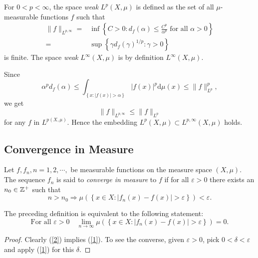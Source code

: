 \begin{definition}
  For $0<p<\infty$, the space \textit{weak} $L^{p}(X,\mu)$ is defined as the set of all $\mu$-measurable functions $f$ such that
  \begin{equation*}
    \begin{aligned}
      \|f\|_{L^{p,\infty}}=&\inf \left\{ C>0:d_f(\alpha)\le \frac{C^{p}}{\alpha ^{p}} \text{ for all }\alpha>0 \right\} \\
      =&\sup\left\{ \gamma d_f(\gamma)^{1 /p}:\gamma>0 \right\} 
    \end{aligned}
  \end{equation*}
  is finite. The space \textit{weak} $L^{\infty}(X,\mu)$ is by definition $L^{\infty}(X,\mu)$.
\end{definition}

\begin{proposition}
  Since 
  \[
    \alpha ^{p}d_f(\alpha)\le \int_{\left\{ x:|f(x)|>\alpha \right\} }|f(x)|^{p}\mathrm{d}\mu(x)\le \|f\|^{p}_{L^{p}},
  \] 
  we get
  \[
  \|f\|_{L^{p,\infty}}\le \|f\|_{L^{p}}
  \] 
  for any $f$ in $L^{p(X,\mu)}$. Hence the embedding $L^{p}(X,\mu)\subset L^{p,\infty}(X,\mu)$ holds.
\end{proposition}
\subsection{Convergence in Measure}
\begin{definition}
  Let  $f,f_n,n=1,2,\cdots,$ be measurable functions on the measure space $(X,\mu)$. The sequence $f_n$ is said to \textit{converge in measure} to $f$ if for all $\varepsilon >0$ there exists an $n_0\in \mathbb{Z}^{+}$ such that
  \begin{equation}\label{1}
    n>n_0\Longrightarrow \mu\left( \left\{ x\in X:|f_n(x)-f(x)|>\varepsilon  \right\}  \right) <\varepsilon .
  \end{equation}
\end{definition}
\begin{proposition}
The preceding definition is equivalent to the following statement:
\begin{equation}\label{2}
  \text{For all }\varepsilon >0 \quad \lim_{n \to \infty} \mu\left( \left\{ x\in X:|f_n(x)-f(x)|>\varepsilon  \right\}  \right) =0.
\end{equation}
\end{proposition}
\begin{proof}
  Clearly (\ref{2}) implies (\ref{1}). To see the converse, given $\varepsilon >0$, pick $0<\delta<\varepsilon $ and apply (\ref{1}) for this $\delta$. 
\end{proof}

